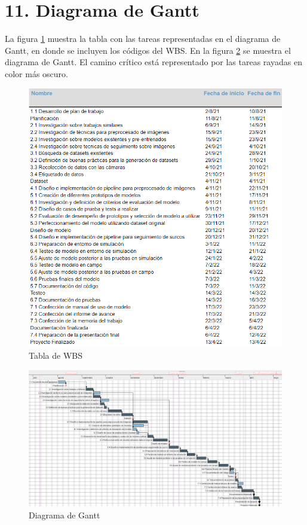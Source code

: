 \documentclass[
11pt, %
codirector, %
]{charter}
\begin{document}
\section{11. Diagrama de Gantt}
\label{sec:gantt}

La figura \ref{fig:gantt_tabla} muestra la tabla con las tareas representadas en el diagrama de Gantt, en donde se incluyen los códigos del WBS. En la figura \ref{fig:diagGantt} se muestra el diagrama de Gantt. El camino crítico está representado por las tareas rayadas en color más oscuro.

\begin{figure}[htpb]
\centering 
\includegraphics[width=1\textwidth]{./Figuras/gantt_tabla.png}
\caption{Tabla de WBS}
\label{fig:gantt_tabla}
\end{figure}


\begin{landscape}
\begin{figure}[htpb]
\centering 
\includegraphics[height=.85\textheight]{./Figuras/gantt.png}
\caption{Diagrama de Gantt}
\label{fig:diagGantt}
\end{figure}
\end{landscape}
\end{document}
